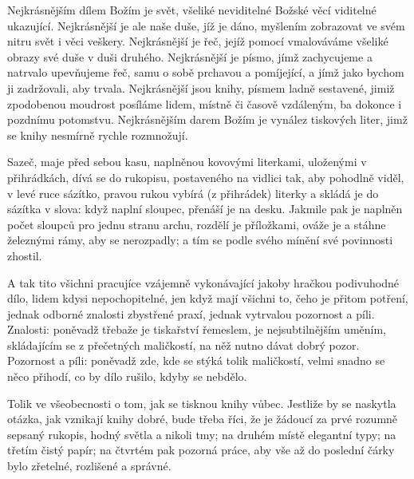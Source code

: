 Nejkrásnějším dílem Božím je svět, všeliké neviditelné Božské věcí viditelné
ukazující. Nejkrásnější je ale naše duše, jíž je dáno, myšlením zobrazovat
ve svém nitru svět i věci veškery. Nejkrásnější je řeč, jejíž pomocí
vmalováváme všeliké obrazy své duše v duši druhého. Nejkrásnější je písmo,
jímž zachycujeme a natrvalo upevňujeme řeč, samu o sobě prchavou a
pomíjející, a jímž jako bychom ji zadržovali, aby trvala. Nejkrásnější jsou
knihy, písmem ladně sestavené, jimiž zpodobenou moudrost posíláme lidem,
místně či časově vzdáleným, ba dokonce i pozdnímu potomstvu. Nejkrásnějším
darem Božím je vynález tiskových liter, jimž se knihy nesmírně rychle
rozmnožují. 

Sazeč, maje před sebou kasu, naplněnou kovovými literkami, uloženými v
přihrádkách, dívá se do rukopisu, postaveného na vidlici tak, aby pohodlně
viděl, v levé ruce sázítko, pravou rukou vybírá (z přihrádek) literky a
skládá je do sázítka v slova: když naplní sloupec, přenáší je na desku.
Jakmile pak je naplněn počet sloupců pro jednu stranu archu, rozdělí je
příložkami, ováže je a stáhne železnými rámy, aby se nerozpadly; a tím se
podle svého mínění své povinnosti zhostil.

A tak tito všichni pracujíce vzájemně vykonávající jakoby hračkou
podivuhodné dílo, lidem kdysi nepochopitelné, jen když mají všichni to, čeho
je přitom potření, jednak odborné znalosti zbystřené praxí, jednak vytrvalou
pozornost a píli. Znalosti: poněvadž třebaže je tiskařství řemeslem, je
nejsubtilnějším uměním, skládajícím se z přečetných maličkostí, na něž nutno
dávat dobrý pozor. Pozornost a píli: poněvadž zde, kde se stýká tolik
maličkostí, velmi snadno se něco přihodí, co by dílo rušilo, kdyby se
nebdělo.

Tolik ve všeobecnosti o tom, jak se tisknou knihy vůbec. Jestliže by se
naskytla otázka, jak vznikají knihy dobré, bude třeba říci, že je žádoucí za
prvé rozumně sepsaný rukopis, hodný světla a nikoli tmy; na druhém místě
elegantní typy; na třetím čistý papír; na čtvrtém pak pozorná práce, aby vše
až do poslední čárky bylo zřetelné, rozlišené a správné.
